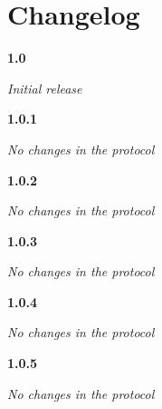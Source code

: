 \chapter{Changelog}

\noindent
\textbf{1.0}
\begin{itemize}
	\renewcommand{\labelitemi}{$\bullet$}
	\textit{Initial release}
\end{itemize}
\newline

\noindent
\textbf{1.0.1}
\begin{itemize}
	\renewcommand{\labelitemi}{$\bullet$}
	\textit{No changes in the protocol}
\end{itemize}
\newline

\noindent
\textbf{1.0.2}
\begin{itemize}
	\renewcommand{\labelitemi}{$\bullet$}
	\textit{No changes in the protocol}
\end{itemize}
\newline

\noindent
\textbf{1.0.3}
\begin{itemize}
	\renewcommand{\labelitemi}{$\bullet$}
	\textit{No changes in the protocol}
\end{itemize}
\newline

\noindent
\textbf{1.0.4}
\begin{itemize}
	\renewcommand{\labelitemi}{$\bullet$}
	\textit{No changes in the protocol}
\end{itemize}
\newline

\noindent
\textbf{1.0.5}
\begin{itemize}
	\renewcommand{\labelitemi}{$\bullet$}
	\textit{No changes in the protocol}
\end{itemize}
\newline
